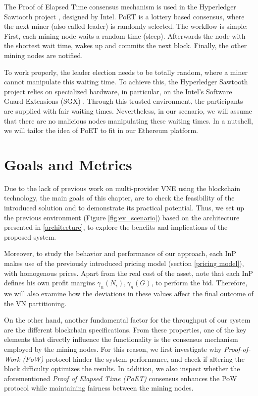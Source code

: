 The Proof of Elapsed Time consensus mechanism is used in the Hyperledger Sawtooth project \citep{sawtooth}, designed by Intel. PoET is a lottery based consensus, where the next miner (also called leader) is randomly selected. The workflow is simple: First, each mining node waits a random time (sleep). Afterwards the node with the shortest wait time, wakes up and commits the next block. Finally, the other mining nodes are notified.

To work properly, the leader election needs to be totally random, where a miner cannot manipulate this waiting time. To achieve this, the Hyperledger Sawtooth project relies on specialized hardware, in particular, on the Intel’s Software Guard Extensions (SGX) \citep{sgx}. Through this trusted environment, the participants are supplied with fair waiting times. Nevertheless, in our scenario, we will assume that there are no malicious nodes manipulating these waiting times. In a nutshell, we will tailor the idea of PoET to fit in our Ethereum platform.
 
\section{Goals and Metrics}  \label{metrics}

Due to the lack of previous work on multi-provider VNE using the blockchain technology, the main goals of this chapter, are to check the feasibility of the introduced solution and to demonstrate its practical potential. Thus, we set up the previous environment (Figure \ref{fig:ev_scenario}) based on the architecture presented in \ref{architecture}, to explore the benefits and implications of the proposed system.

Moreover, to study the behavior and performance of our approach, each InP makes use of the previously introduced pricing model (section \ref{pricing model}), with homogenous prices. Apart from the real cost of the asset, note that each InP defines his own profit margins $\gamma_n(N_i),\gamma_n(G)$, to perform the bid. Therefore, we will also examine how the deviations in these values affect the final outcome of the VN partitioning.

On the other hand, another fundamental factor for the throughput of our system are the different blockchain specifications. From these properties, one of the key elements that directly influence the functionality is the consensus mechanism employed by the mining nodes. For this reason, we first investigate why \textit{Proof-of-Work (PoW)} protocol hinder the system performance, and check if altering the block difficulty optimizes the results. In addition, we also inspect whether the aforementioned \textit{Proof of Elapsed Time (PoET)} consensus enhances the PoW protocol while maintaining fairness between the mining nodes.

